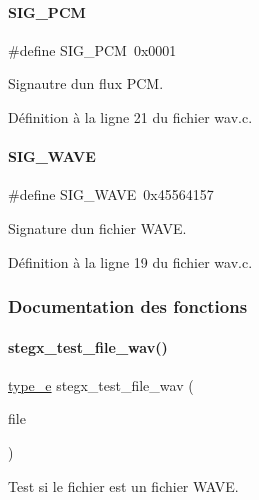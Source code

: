 \paragraph{\texorpdfstring{S\+I\+G\+\_\+\+P\+CM}{SIG\_PCM}}
{\footnotesize\ttfamily \#define S\+I\+G\+\_\+\+P\+CM~0x0001}

Signautre d\textquotesingle{}un flux P\+CM. 

Définition à la ligne 21 du fichier wav.\+c.

\mbox{\label{a00101_adda339628c1139c6c008467930be5266}} 
\paragraph{\texorpdfstring{S\+I\+G\+\_\+\+W\+A\+VE}{SIG\_WAVE}}
{\footnotesize\ttfamily \#define S\+I\+G\+\_\+\+W\+A\+VE~0x45564157}

Signature d\textquotesingle{}un fichier W\+A\+VE. 

Définition à la ligne 19 du fichier wav.\+c.



\subsubsection{Documentation des fonctions}
\mbox{\label{a00101_ade2af55cc4dbaf47d31e91a4681415f1}} 
\paragraph{\texorpdfstring{stegx\+\_\+test\+\_\+file\+\_\+wav()}{stegx\_test\_file\_wav()}}
{\footnotesize\ttfamily \hyperlink{a00047_af1ca434cca36ba9fb2a45f6cef3a16d6}{type\+\_\+e} stegx\+\_\+test\+\_\+file\+\_\+wav (\begin{DoxyParamCaption}\item[{F\+I\+LE $\ast$}]{file }\end{DoxyParamCaption})}



Test si le fichier est un fichier W\+A\+VE. 


